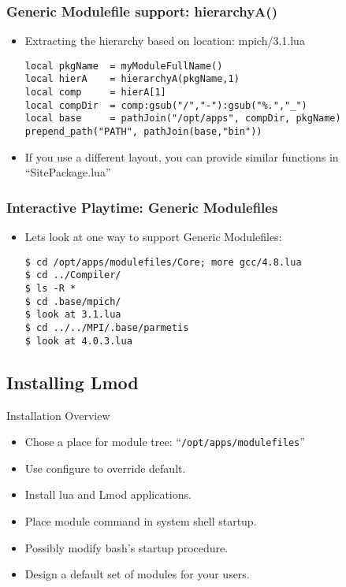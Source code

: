 \documentclass{beamer}
\begin{document}
\begin{frame}[fragile]
    \frametitle{Generic Modulefile support: hierarchyA()}
  \begin{itemize}
    \item Extracting the hierarchy based on location: mpich/3.1.lua
    {\small
\begin{verbatim}
local pkgName  = myModuleFullName()
local hierA    = hierarchyA(pkgName,1)
local comp     = hierA[1]
local compDir  = comp:gsub("/","-"):gsub("%.","_")
local base     = pathJoin("/opt/apps", compDir, pkgName)
prepend_path("PATH", pathJoin(base,"bin"))
\end{verbatim}
}
    \item If you use a different layout, you can provide similar
      functions in ``SitePackage.lua''
  \end{itemize}
\end{frame}

\begin{frame}[fragile]
    \frametitle{Interactive Playtime: Generic Modulefiles}
  \begin{itemize}
    \item Lets look at one way to support Generic Modulefiles:
    {\small
\begin{verbatim}
$ cd /opt/apps/modulefiles/Core; more gcc/4.8.lua
$ cd ../Compiler/
$ ls -R *
$ cd .base/mpich/
$ look at 3.1.lua
$ cd ../../MPI/.base/parmetis
$ look at 4.0.3.lua
\end{verbatim}
}
  \end{itemize}
\end{frame}



\subsection{Installing Lmod}
\label{sec:installing}

\begin{frame}{Installation Overview}
  \begin{itemize}
    \item Chose a place for module tree: ``\texttt{/opt/apps/modulefiles}''
    \item Use configure to override default.
    \item Install lua and Lmod applications.
    \item Place module command in system shell startup.
    \item Possibly modify bash's startup procedure.
    \item Design a default set of modules for your users.
  \end{itemize}
\end{frame}
\end{document}
